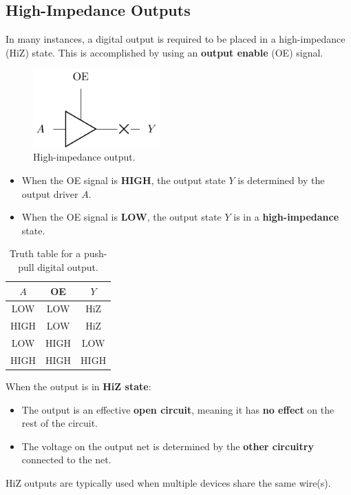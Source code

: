 \documentclass[a4paper]{report}
\begin{document}
\subsection{High-Impedance Outputs}
In many instances, a digital output is required to be placed in a high-impedance (HiZ) state.
This is accomplished by using an \textbf{output enable} (OE) signal.
\begin{figure}[H]
    \centering
    \includegraphics[height = 3cm, keepaspectratio = true]{figures/HiZ.pdf}
    \caption{High-impedance output.} %
\end{figure}
\begin{itemize}
    \item When the OE signal is \textbf{HIGH}, the output state \(Y\) is determined by the output driver \(A\).
    \item When the OE signal is \textbf{LOW}, the output state \(Y\) is in a \textbf{high-impedance} state.
\end{itemize}
\begin{table}[H]
    \centering
    \begin{tabular}{c c | c} %
        \toprule
        \textbf{\(A\)} & \textbf{OE} & \textbf{\(Y\)} \\
        \midrule
        LOW            & LOW         & HiZ            \\
        HIGH           & LOW         & HiZ            \\
        LOW            & HIGH        & LOW            \\
        HIGH           & HIGH        & HIGH           \\
        \bottomrule
    \end{tabular}
    \caption{Truth table for a push-pull digital output.} %
\end{table}
When the output is in \textbf{HiZ state}:
\begin{itemize}
    \item The output is an effective \textbf{open circuit}, meaning it has \textbf{no effect} on the rest of the circuit.
    \item The voltage on the output net is determined by the \textbf{other circuitry} connected to the net.
\end{itemize}
HiZ outputs are typically used when multiple devices share the same wire(s).
\end{document}
